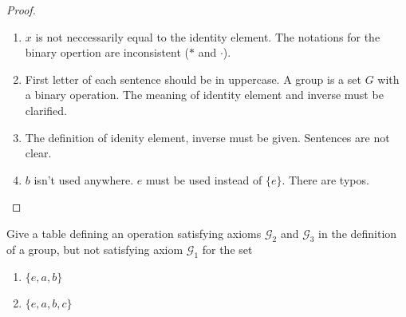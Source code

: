 \begin{proof}
    \begin{enumerate}
        \item $x$ is not neccessarily equal to the identity element. The notations for the binary opertion are inconsistent ($*$ and $\cdot$).
        \item First letter of each sentence should be in uppercase. A group is a set $G$ with a binary operation. The meaning of identity element and inverse must be clarified.
        \item The definition of idenity element, inverse must be given. Sentences are not clear.
        \item $b$ isn't used anywhere. $e$ must be used instead of $\{e\}$. There are typos.
    \end{enumerate}
\end{proof}

\newpage
\begin{exercise}
    Give a table defining an operation satisfying axioms $\mathscr{G}_{2}$ and $\mathscr{G}_{3}$ in the definition of a group, but not satisfying axiom $\mathscr{G}_{1}$ for the set
    \begin{enumerate}[label={\textbf{\alph*.}}]
        \item $\{ e, a, b \}$
        \item $\{ e, a, b, c \}$
    \end{enumerate}
\end{exercise}

